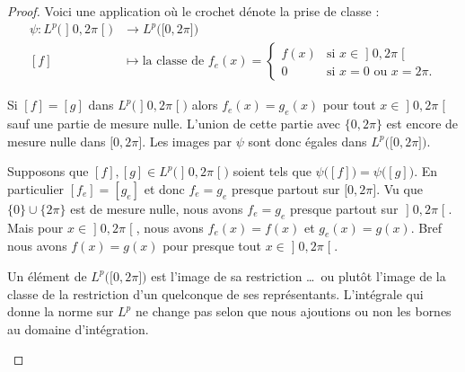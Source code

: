 \begin{proof}
	Voici une application où le crochet dénote la prise de classe :
	\begin{equation}
		\begin{aligned}
			\psi\colon L^p\big(\mathopen] 0 , 2\pi \mathclose[\big) & \to L^p\big(\mathopen[ 0 , 2\pi \mathclose]\big)                                          \\
			[f]                                                     & \mapsto \text{la classe de } f_e(x)=\begin{cases}
				                                                                                              f(x) & \text{si } x\in\mathopen] 0 , 2\pi \mathclose[ \\
				                                                                                              0    & \text{si } x=0\text{ ou } x=2\pi.
			                                                                                              \end{cases}
		\end{aligned}
	\end{equation}
	\begin{subproof}
		Si \( [f]=[g]\) dans \( L^p\big(\mathopen] 0 , 2\pi \mathclose[\big)\) alors \( f_e(x)=g_e(x)\) pour tout \( x\in \mathopen] 0 , 2\pi \mathclose[ \) sauf une partie de mesure nulle. L'union de cette partie avec \( \{ 0,2\pi \}\) est encore de mesure nulle dans \( \mathopen[ 0 , 2\pi \mathclose]\). Les images par \( \psi\) sont donc égales dans \( L^p\big( \mathopen[ 0 , 2\pi \mathclose] \big)\).

		\spitem[Injective]
		Supposons que \( [f], [g]\in L^p\big( \mathopen] 0,2\pi\mathclose[ \big)\) soient tels que \( \psi\big( [f] \big)=\psi\big( [g] \big)\). En particulier \( [f_e]=[g_e]\) et donc \( f_e=g_e\) presque partout sur \( \mathopen[ 0,2\pi\mathclose]\). Vu que \( \{ 0 \}\cup\{ 2\pi \}\) est de mesure nulle, nous avons \( f_e=g_e\) presque partout sur \( \mathopen] 0,2\pi\mathclose[\). Mais pour \( x\in\mathopen] 0,2\pi\mathclose[\), nous avons \( f_e(x)=f(x)\) et \( g_e(x)=g(x)\). Bref nous avons \( f(x)=g(x)\) pour presque tout \( x\in\mathopen] 0,2\pi\mathclose[\).

		\spitem[Surjective]
		Un élément de \( L^p\big( \mathopen[ 0 , 2\pi \mathclose] \big)\) est l'image de sa restriction \ldots\ ou plutôt l'image de la classe de la restriction d'un quelconque de ses représentants.
		\spitem[Isométrie]
		L'intégrale qui donne la norme sur \( L^p\) ne change pas selon que nous ajoutions ou non les bornes au domaine d'intégration.
	\end{subproof}


\end{proof}
